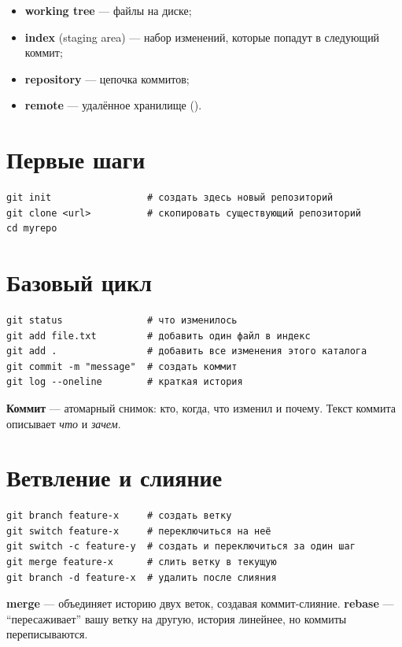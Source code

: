 \begin{itemize}
  \item \textbf{working tree} --- файлы на диске;
  \item \textbf{index} (staging area) --- набор
    изменений, которые попадут в следующий коммит;
  \item \textbf{repository} --- цепочка коммитов;
  \item \textbf{remote} --- удалённое хранилище
    ().
\end{itemize}

\section{Первые шаги}

\begin{verbatim}
git init                 # создать здесь новый репозиторий
git clone <url>          # скопировать существующий репозиторий
cd myrepo
\end{verbatim}

\section{Базовый цикл}

\begin{verbatim}
git status               # что изменилось
git add file.txt         # добавить один файл в индекс
git add .                # добавить все изменения этого каталога
git commit -m "message"  # создать коммит
git log --oneline        # краткая история
\end{verbatim}

\textbf{Коммит} --- атомарный снимок: кто, когда, что
изменил и почему. Текст коммита описывает \emph{что}
и \emph{зачем}.

\section{Ветвление и слияние}

\begin{verbatim}
git branch feature-x     # создать ветку
git switch feature-x     # переключиться на неё
git switch -c feature-y  # создать и переключиться за один шаг
git merge feature-x      # слить ветку в текущую
git branch -d feature-x  # удалить после слияния
\end{verbatim}

\textbf{merge} --- объединяет историю двух веток,
создавая коммит-слияние. \textbf{rebase} ---
``пересаживает'' вашу ветку на другую, история
линейнее, но коммиты переписываются.


